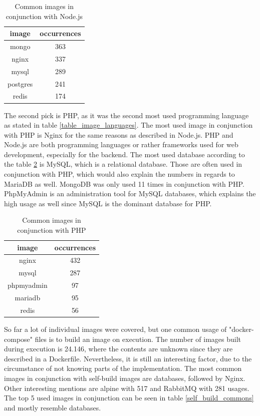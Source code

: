 \begin{table}[h!]
    \centering
    \begin{tabular}{ |c|c| }
    \hline
    image & occurrences \\
    \hline
         mongo & 363 \\
         nginx & 337 \\
         mysql & 289 \\
         postgres & 241 \\
         redis & 174 \\
    \hline
    \end{tabular}
    \caption{Common images in conjunction with Node.js}
    \label{node_commons}
\end{table}

The second pick is PHP, as it was the second most used programming language as stated in table \ref{table_image_languages}. The most used image in conjunction with PHP is Nginx for the same reasons as described in Node.js. PHP and Node.js are both programming languages or rather frameworks used for web development, especially for the backend. The most used database according to the table \ref{php_commons} is MySQL, which is a relational database. Those are often used in conjunction with PHP, which would also explain the numbers in regards to MariaDB as well. MongoDB was only used 11 times in conjunction with PHP. PhpMyAdmin is an administration tool for MySQL databases, which explains the high usage as well since MySQL is the dominant database for PHP.

\begin{table}[h!]
    \centering
    \begin{tabular}{ |c|c| }
    \hline
    image & occurrences \\
    \hline
         nginx & 432 \\
         mysql & 287 \\
         phpmyadmin & 97 \\
         mariadb & 95 \\
         redis & 56 \\
    \hline
    \end{tabular}
    \caption{Common images in conjunction with PHP}
    \label{php_commons}
\end{table}

So far a lot of individual images were covered, but one common usage of "docker-compose" files is to build an image on execution. The number of images built during execution is 24.146, where the contents are unknown since they are described in a Dockerfile. Nevertheless, it is still an interesting factor, due to the circumstance of not knowing parts of the implementation. The most common images in conjunction with self-build images are databases, followed by Nginx. Other interesting mentions are alpine with 517 and RabbitMQ with 281 usages. The top 5 used images in conjunction can be seen in table \ref{self_build_commons} and mostly resemble databases.

